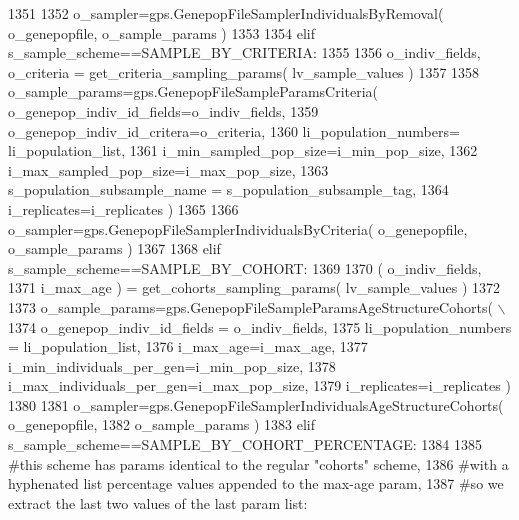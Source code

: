 \begin{DoxyCode}
1351 
1352         o\_sampler=gps.GenepopFileSamplerIndividualsByRemoval( o\_genepopfile, o\_sample\_params )
1353 
1354     \textcolor{keywordflow}{elif} s\_sample\_scheme==SAMPLE\_BY\_CRITERIA:
1355 
1356         o\_indiv\_fields, o\_criteria = get\_criteria\_sampling\_params( lv\_sample\_values )
1357 
1358         o\_sample\_params=gps.GenepopFileSampleParamsCriteria( o\_genepop\_indiv\_id\_fields=o\_indiv\_fields,
1359                                                                     o\_genepop\_indiv\_id\_critera=o\_criteria,
1360                                                                     li\_population\_numbers=
      li\_population\_list,
1361                                                                     i\_min\_sampled\_pop\_size=i\_min\_pop\_size,
1362                                                                     i\_max\_sampled\_pop\_size=i\_max\_pop\_size,
1363                                                                     s\_population\_subsample\_name = 
      s\_population\_subsample\_tag,
1364                                                                     i\_replicates=i\_replicates )
1365 
1366         o\_sampler=gps.GenepopFileSamplerIndividualsByCriteria( o\_genepopfile, o\_sample\_params )
1367 
1368     \textcolor{keywordflow}{elif} s\_sample\_scheme==SAMPLE\_BY\_COHORT:
1369 
1370         ( o\_indiv\_fields,
1371             i\_max\_age ) = get\_cohorts\_sampling\_params( lv\_sample\_values )
1372 
1373         o\_sample\_params=gps.GenepopFileSampleParamsAgeStructureCohorts( \(\backslash\)
1374                                         o\_genepop\_indiv\_id\_fields = o\_indiv\_fields,
1375                                         li\_population\_numbers = li\_population\_list,
1376                                         i\_max\_age=i\_max\_age,
1377                                         i\_min\_individuals\_per\_gen=i\_min\_pop\_size,
1378                                         i\_max\_individuals\_per\_gen=i\_max\_pop\_size,
1379                                         i\_replicates=i\_replicates )
1380 
1381         o\_sampler=gps.GenepopFileSamplerIndividualsAgeStructureCohorts( o\_genepopfile,
1382                                                                     o\_sample\_params )
1383     \textcolor{keywordflow}{elif} s\_sample\_scheme==SAMPLE\_BY\_COHORT\_PERCENTAGE:
1384 
1385         \textcolor{comment}{#this scheme has params identical to the regular "cohorts" scheme,}
1386         \textcolor{comment}{#with a hyphenated list percentage values appended to the max-age param, }
1387         \textcolor{comment}{#so we extract the last two values of the last param list:  }

\end{DoxyCode}

